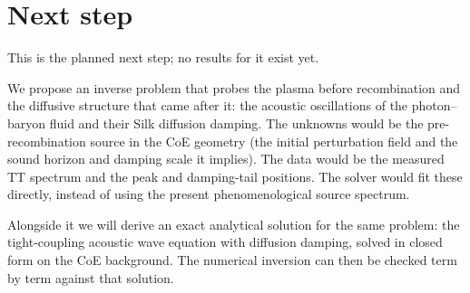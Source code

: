 \documentclass[11pt]{article}
\begin{document}
\section{Next step}
This is the planned next step; no results for it exist yet.

We propose an inverse problem that probes the plasma before recombination and the diffusive structure that came after it: the acoustic oscillations of the photon--baryon fluid and their Silk diffusion damping. The unknowns would be the pre-recombination source in the CoE geometry (the initial perturbation field and the sound horizon and damping scale it implies). The data would be the measured TT spectrum and the peak and damping-tail positions. The solver would fit these directly, instead of using the present phenomenological source spectrum.

Alongside it we will derive an exact analytical solution for the same problem: the tight-coupling acoustic wave equation with diffusion damping, solved in closed form on the CoE background. The numerical inversion can then be checked term by term against that solution.
\end{document}
